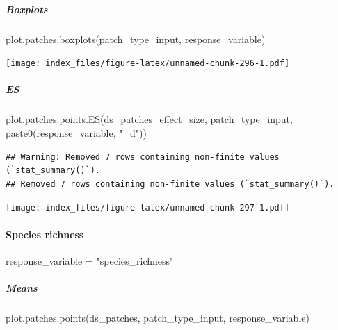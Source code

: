 \documentclass[
]{article}
\newenvironment{Shaded}{\begin{snugshade}}{\end{snugshade}}
\newcommand{\FunctionTok}[1]{\textcolor[rgb]{0.00,0.00,0.00}{#1}}
\newcommand{\NormalTok}[1]{#1}
\newcommand{\OtherTok}[1]{\textcolor[rgb]{0.56,0.35,0.01}{#1}}
\newcommand{\StringTok}[1]{\textcolor[rgb]{0.31,0.60,0.02}{#1}}
\begin{document}
\hypertarget{boxplots-16}{%
\subparagraph{Boxplots}\label{boxplots-16}}

\begin{Shaded}
\begin{Highlighting}[]
\FunctionTok{plot.patches.boxplots}\NormalTok{(patch\_type\_input,}
\NormalTok{                       response\_variable)}
\end{Highlighting}
\end{Shaded}

\texttt{[image: index\_files/figure-latex/unnamed-chunk-296-1.pdf]}

\hypertarget{es-1}{%
\subparagraph{ES}\label{es-1}}

\begin{Shaded}
\begin{Highlighting}[]
\FunctionTok{plot.patches.points.ES}\NormalTok{(ds\_patches\_effect\_size, patch\_type\_input,}
                       \FunctionTok{paste0}\NormalTok{(response\_variable, }\StringTok{"\_d"}\NormalTok{))}
\end{Highlighting}
\end{Shaded}

\begin{verbatim}
## Warning: Removed 7 rows containing non-finite values (`stat_summary()`).
## Removed 7 rows containing non-finite values (`stat_summary()`).
\end{verbatim}

\texttt{[image: index\_files/figure-latex/unnamed-chunk-297-1.pdf]}

\hypertarget{species-richness}{%
\paragraph{Species richness}\label{species-richness}}

\begin{Shaded}
\begin{Highlighting}[]
\NormalTok{response\_variable }\OtherTok{=} \StringTok{"species\_richness"}
\end{Highlighting}
\end{Shaded}

\hypertarget{means-18}{%
\subparagraph{Means}\label{means-18}}

\begin{Shaded}
\begin{Highlighting}[]
\FunctionTok{plot.patches.points}\NormalTok{(ds\_patches, patch\_type\_input,}
\NormalTok{                       response\_variable)}
\end{Highlighting}
\end{Shaded}
\end{document}
